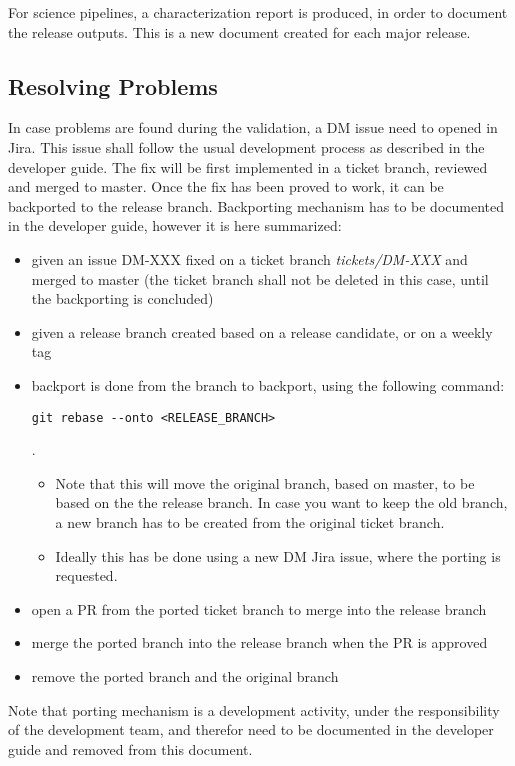 For science pipelines, a characterization report is produced, in order to document the release outputs.
This is a new document created for each major release.


\subsection{Resolving Problems}

In case problems are found during the validation, a DM issue need to opened in Jira.
This issue shall follow the usual development process as described in the developer guide. 
The fix will be first implemented in a ticket branch, reviewed and merged to master.
Once the fix has been proved to work, it can be backported to the release branch. 
Backporting mechanism has to be documented in the developer guide, however it is here summarized:

\begin{itemize}
\item given an issue DM-XXX fixed on a ticket branch \textit{tickets/DM-XXX} and merged to master (the ticket branch shall not be deleted in this case, until the backporting is concluded)
\item given a release branch created based on a release candidate, or on a weekly tag
\item backport is done from the branch to backport, using the following command: \begin{verbatim}git rebase --onto <RELEASE_BRANCH>\end{verbatim} . 
\begin{itemize}
\item Note that this will move the original branch, based on master, to be based on the the release branch. In case you want to keep the old branch, a new branch has to be created from the original ticket branch. 
\item Ideally this has be done using a new DM Jira issue, where the porting is requested.
\end{itemize}
\item open a PR from the ported ticket branch to merge into the release branch
\item merge the ported branch into the release branch when the PR is approved
\item remove the ported branch and the original branch
\end{itemize}

Note that porting mechanism is a development activity, under the responsibility of the development team, and therefor need to be documented in the developer guide and removed from this document.

